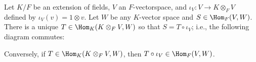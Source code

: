     \begin{theorem}
        Let $K/F$ be an extension of fields, $V$ an $F$-vectorspace, and $\iota_V:V \rightarrow K \otimes_F V$ defined by $\iota_V (v) = 1 \otimes v$. Let $W$ be any $K$-vector space and $S \in \Hom_F(V,W)$. There is a unique $T \in \Hom_K(K \otimes_F V,W)$ so that $S = T \circ \iota_V$; i.e., the following diagram commutes:
            \begin{center}
            \end{center}
        Conversely, if $T \in \Hom_K(K \otimes_F V,W)$, then $T \circ \iota_V \in \Hom_F(V,W)$.
    \end{theorem}
